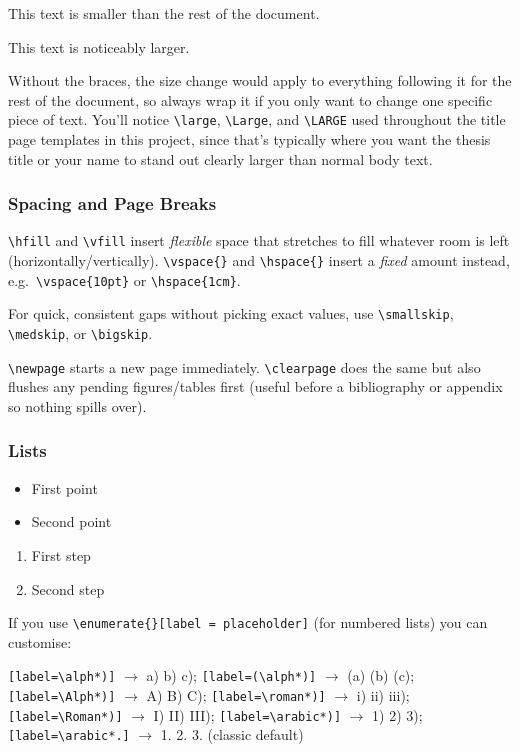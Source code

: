 {\footnotesize This text is smaller than the rest of the document.}

{\Large This text is noticeably larger.}

Without the braces, the size change would apply to everything following it for the rest of the document, so always wrap it if you only want to change one specific piece of text. You'll notice \verb|\large|, \verb|\Large|, and \verb|\LARGE| used throughout the title page templates in this project, since that's typically where you want the thesis title or your name to stand out clearly larger than normal body text.

\subsubsection*{Spacing and Page Breaks}
\verb|\hfill| and \verb|\vfill| insert \emph{flexible} space that stretches to fill whatever room is left (horizontally/vertically). \verb|\vspace{}| and \verb|\hspace{}| insert a \emph{fixed} amount instead, e.g.\ \verb|\vspace{10pt}| or \verb|\hspace{1cm}|. 

For quick, consistent gaps without picking exact values, use \verb|\smallskip|, \verb|\medskip|, or \verb|\bigskip|.

\verb|\newpage| starts a new page immediately. \verb|\clearpage| does the same but also flushes any pending figures/tables first (useful before a bibliography or appendix so nothing spills over).


\subsubsection*{Lists}
\begin{itemize}
    \item First point
    \item Second point
\end{itemize}

\begin{enumerate}
    \item First step
    \item Second step
\end{enumerate}

If you use \texttt{\textbackslash enumerate\{\}[label = placeholder]} (for numbered lists) you can customise:

\texttt{[label=\textbackslash alph*)]} \(\rightarrow\) a) b) c);
\texttt{[label=(\textbackslash alph*)]} \(\rightarrow\) (a) (b) (c);
\texttt{[label=\textbackslash Alph*)]} \(\rightarrow\) A) B) C);
\texttt{[label=\textbackslash roman*)]} \(\rightarrow\) i) ii) iii);
\texttt{[label=\textbackslash Roman*)]} \(\rightarrow\) I) II) III);
\texttt{[label=\textbackslash arabic*)]} \(\rightarrow\) 1) 2) 3);
\texttt{[label=\textbackslash arabic*.]} \(\rightarrow\) 1. 2. 3. (classic default)

